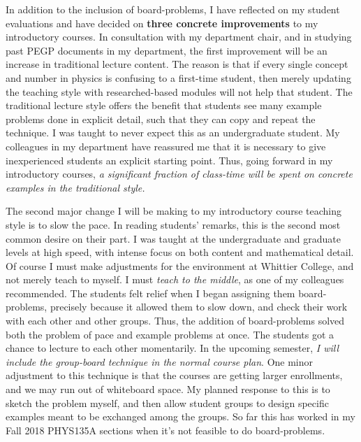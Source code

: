 \documentclass[../../main.tex]{subfiles}
\begin{document}
In addition to the inclusion of board-problems, I have reflected on my student evaluations and have decided on \textbf{three concrete improvements} to my introductory courses.  In consultation with my department chair, and in studying past PEGP documents in my department, the first improvement will be an increase in traditional lecture content.  The reason is that if every single concept and number in physics is confusing to a first-time student, then merely updating the teaching style with researched-based modules will not help that student.  The traditional lecture style offers the benefit that students see many example problems done in explicit detail, such that they can copy and repeat the technique.  I was taught to never expect this as an undergraduate student.  My colleagues in my department have reassured me that it is necessary to give inexperienced students an explicit starting point.  Thus, going forward in my introductory courses, \textit{a significant fraction of class-time will be spent on concrete examples in the traditional style.} \\ \hspace{0.1cm}

The second major change I will be making to my introductory course teaching style is to slow the pace.  In reading students' remarks, this is the second most common desire on their part.  I was taught at the undergraduate and graduate levels at high speed, with intense focus on both content and mathematical detail.  Of course I must make adjustments for the environment at Whittier College, and not merely teach to myself.  I must \textit{teach to the middle}, as one of my colleagues recommended.  The students felt relief when I began assigning them board-problems, precisely because it allowed them to slow down, and check their work with each other and other groups.  Thus, the addition of board-problems solved both the problem of pace and example problems at once.  The students got a chance to lecture to each other momentarily.  In the upcoming semester, \textit{I will include the group-board technique in the normal course plan}. One minor adjustment to this technique is that the courses are getting larger enrollments, and we may run out of whiteboard space.  My planned response to this is to sketch the problem myself, and then allow student groups to design specific examples meant to be exchanged among the groups.  So far this has worked in my Fall 2018 PHYS135A sections when it's not feasible to do board-problems.  \\ \hspace{0.1cm}
\end{document}
